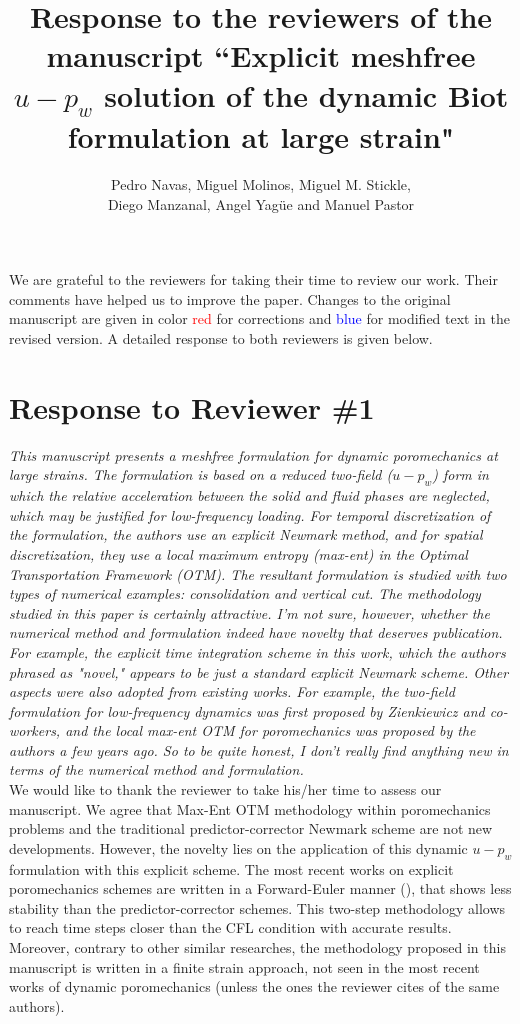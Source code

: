 \documentclass[12pt]{article}
\title{Response to the reviewers of the manuscript ``Explicit meshfree $u-p_w$ solution of the dynamic Biot formulation at large strain"}
\author{Pedro Navas, Miguel Molinos, Miguel M. Stickle, \\ Diego Manzanal, Angel Yag\"ue and Manuel Pastor}
\begin{document}
\maketitle

We  are grateful to the reviewers for taking their time  to review our work. Their comments have helped us to improve the paper. Changes to the original manuscript are given in  color \textcolor{red}{red} for corrections and  \textcolor{blue}{blue} for modified text in the revised version.  A detailed response to both reviewers is given below.

\section*{Response to Reviewer \#1}
{\it
This manuscript presents a meshfree formulation for dynamic poromechanics at large strains. The formulation is based on a reduced two-field ($u-p_w$) form in which the relative acceleration between the solid and fluid phases are neglected, which may be justified for low-frequency loading. For temporal discretization of the formulation, the authors use an explicit Newmark method, and for spatial discretization, they use a local maximum entropy (max-ent) in the Optimal Transportation Framework (OTM). The resultant formulation is studied with two types of numerical examples: consolidation and vertical cut. The methodology studied in this paper is certainly attractive. I'm not sure, however, whether the numerical method and formulation indeed have novelty that deserves publication. For example, the explicit time integration scheme in this work, which the authors phrased as "novel," appears to be just a standard explicit Newmark scheme. Other aspects were also adopted from existing works. For example, the two-field formulation for low-frequency dynamics was first proposed by Zienkiewicz and co-workers, and the local max-ent OTM for poromechanics was proposed by the authors a few years ago. So to be quite honest, I don't really find anything new in terms of the numerical method and formulation.}\\

We would like to thank the reviewer to take his/her time to assess our manuscript. We agree that Max-Ent OTM methodology within poromechanics problems and the traditional predictor-corrector Newmark scheme are not new developments. However, the novelty lies on the application of this dynamic $u-p_w$ formulation with this explicit scheme. The most recent works on explicit poromechanics schemes are written in a Forward-Euler manner (\cite{ZHANG_et_al_2009}), that shows less stability than the predictor-corrector schemes. This two-step methodology allows to reach time steps closer than the CFL condition with accurate results. Moreover, contrary to other similar researches, the methodology proposed in this manuscript is written in a finite strain approach, not seen in the most recent works of dynamic poromechanics (unless the ones the reviewer cites of the same authors).\\
\end{document}
